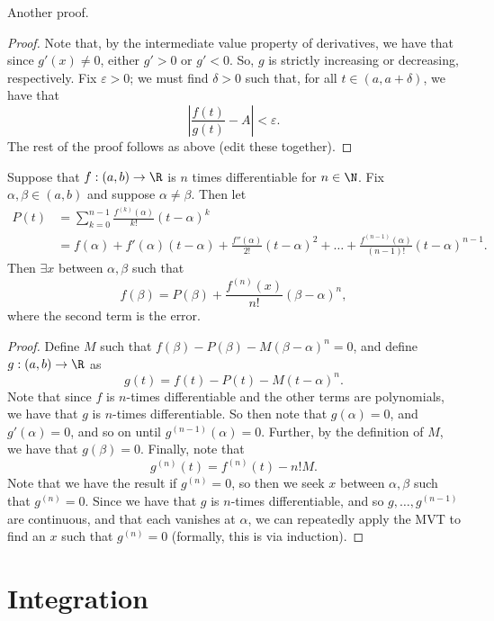 \documentclass{notes}
\begin{document}
Another proof.
\begin{proof}
  Note that, by the intermediate value property of derivatives, we have that since $g'(x) \neq 0$,
  either $g' > 0$ or $g' < 0$. So, $g$ is strictly increasing or decreasing, respectively. Fix
  $\varepsilon > 0$; we must find $\delta > 0$ such that, for all $t\in (a, a + \delta)$, we have
  that $$\left| \frac{f(t)}{g(t)} - A \right| < \varepsilon.$$ The rest of the proof follows as
  above (edit these together).
\end{proof}

\begin{theorem}
  Suppose that $f: (a,b) \to \R$ is $n$ times differentiable for $n\in\N$. Fix $\alpha, \beta\in
  (a,b)$ and suppose $\alpha\neq\beta$. Then let
  \begin{align*}
    P(t) &= \sum_{k=0}^{n-1} \frac{f^{(k)}(\alpha)}{k!}(t-\alpha)^k \\
         &= f(\alpha) + f'(\alpha)(t-\alpha) + \frac{f''(\alpha)}{2!}(t-\alpha)^2 + \dots +
    \frac{f^{(n-1)}(\alpha)}{(n-1)!}(t-\alpha)^{n-1}.
  \end{align*}
  Then $\exists x$ between $\alpha, \beta$ such that $$f(\beta) = P(\beta) +
  \frac{f^{(n)}(x)}{n!}(\beta-\alpha)^n,$$ where the second term is the error. 
\end{theorem}
\begin{proof}
  Define $M$ such that $f(\beta) - P(\beta) - M(\beta - \alpha)^n = 0$, and define $g:(a,b)\to\R$ as
  $$g(t) = f(t) - P(t) - M(t-\alpha)^n.$$ Note that since $f$ is $n$-times differentiable and the
  other terms are polynomials, we have that $g$ is $n$-times differentiable. So then note that
  $g(\alpha) = 0$, and $g'(\alpha) = 0$, and so on until $g^{(n-1)}(\alpha) = 0$. Further, by the
  definition of $M$, we have that $g(\beta) = 0$. Finally, note that 
  $$g^{(n)}(t) = f^{(n)}(t) - n!M.$$ Note that we have the result if $g^{(n)} = 0$, so then we seek
  $x$ between $\alpha, \beta$ such that $g^{(n)} = 0.$ Since we have that $g$ is $n$-times
  differentiable, and so $g, \ldots, g^{(n-1)}$ are continuous, and that each vanishes at $\alpha$,
  we can repeatedly apply the MVT to find an $x$ such that $g^{(n)} = 0$ (formally, this is via
  induction).
\end{proof}

\section{Integration}
\end{document}
